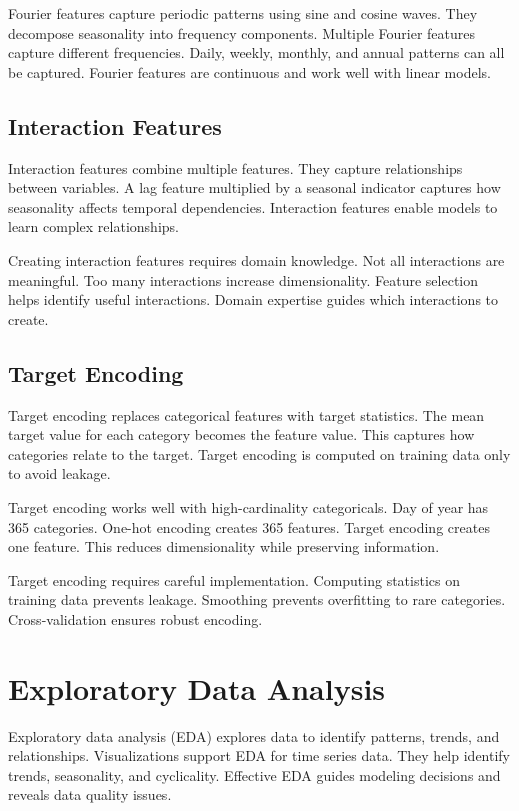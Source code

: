 Fourier features capture periodic patterns using sine and cosine waves. They decompose seasonality into frequency components. Multiple Fourier features capture different frequencies. Daily, weekly, monthly, and annual patterns can all be captured. Fourier features are continuous and work well with linear models.

\subsection{Interaction Features}

Interaction features combine multiple features. They capture relationships between variables. A lag feature multiplied by a seasonal indicator captures how seasonality affects temporal dependencies. Interaction features enable models to learn complex relationships.

Creating interaction features requires domain knowledge. Not all interactions are meaningful. Too many interactions increase dimensionality. Feature selection helps identify useful interactions. Domain expertise guides which interactions to create.

\subsection{Target Encoding}

Target encoding replaces categorical features with target statistics. The mean target value for each category becomes the feature value. This captures how categories relate to the target. Target encoding is computed on training data only to avoid leakage.

Target encoding works well with high-cardinality categoricals. Day of year has 365 categories. One-hot encoding creates 365 features. Target encoding creates one feature. This reduces dimensionality while preserving information.

Target encoding requires careful implementation. Computing statistics on training data prevents leakage. Smoothing prevents overfitting to rare categories. Cross-validation ensures robust encoding.

\section{Exploratory Data Analysis}

Exploratory data analysis (EDA) explores data to identify patterns, trends, and relationships. Visualizations support EDA for time series data. They help identify trends, seasonality, and cyclicality. Effective EDA guides modeling decisions and reveals data quality issues.

